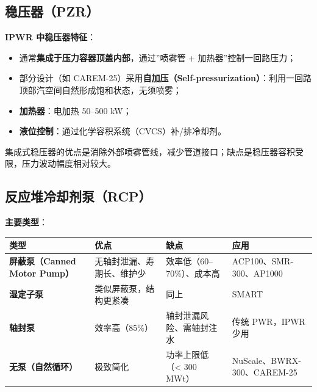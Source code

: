 \documentclass[
  UTF8,
  scheme=plain,
  fontsize=10pt,
  openany
]{ctexbook}
\begin{document}
\subsection{稳压器（PZR）}\label{ux7a33ux538bux5668pzr}

\textbf{IPWR 中稳压器特征}：

\begin{itemize}
\tightlist
\item
  通常\textbf{集成于压力容器顶盖内部}，通过''喷雾管 +
  加热器''控制一回路压力；
\item
  部分设计（如
  CAREM-25）采用\textbf{自加压（Self-pressurization）}：利用一回路顶部汽空间自然形成饱和状态，无须喷雾；
\item
  \textbf{加热器}：电加热 50--500 kW；
\item
  \textbf{液位控制}：通过化学容积系统（CVCS）补/排冷却剂。
\end{itemize}

集成式稳压器的优点是消除外部喷雾管线，减少管道接口；缺点是稳压器容积受限，压力波动幅度相对较大。

\subsection{反应堆冷却剂泵（RCP）}\label{ux53cdux5e94ux5806ux51b7ux5374ux5242ux6cf5rcp}

\textbf{主要类型}：

{\def\LTcaptype{none} %
\begin{longtable}[]{@{}
  >{\raggedright\arraybackslash}p{}
  >{\raggedright\arraybackslash}p{}
  >{\raggedright\arraybackslash}p{}
  >{\raggedright\arraybackslash}p{}@{}}
\toprule\noalign{}
\begin{minipage}[b]{\linewidth}\raggedright
类型
\end{minipage} & \begin{minipage}[b]{\linewidth}\raggedright
优点
\end{minipage} & \begin{minipage}[b]{\linewidth}\raggedright
缺点
\end{minipage} & \begin{minipage}[b]{\linewidth}\raggedright
应用
\end{minipage} \\
\midrule\noalign{}
\endhead
\bottomrule\noalign{}
\endlastfoot
\textbf{屏蔽泵（Canned Motor Pump）} & 无轴封泄漏、寿期长、维护少 &
效率低（60--70\%）、成本高 & ACP100、SMR-300、AP1000 \\
\textbf{湿定子泵} & 类似屏蔽泵，结构更紧凑 & 同上 & SMART \\
\textbf{轴封泵} & 效率高（85\%） & 轴封泄漏风险、需轴封注水 & 传统
PWR，IPWR 少用 \\
\textbf{无泵（自然循环）} & 极致简化 & 功率上限低（\textless{} 300 MWt）
& NuScale、BWRX-300、CAREM-25 \\
\end{longtable}
}
\end{document}
